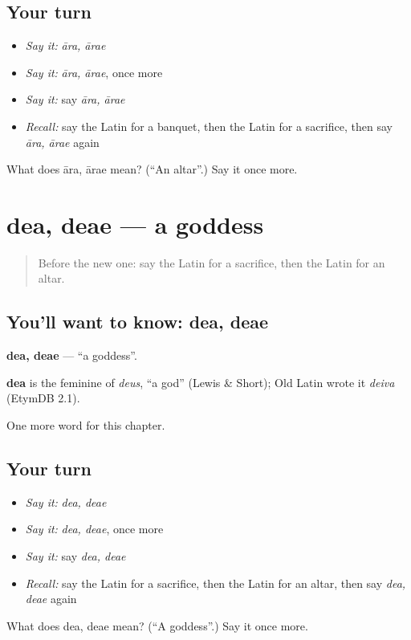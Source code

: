 \subsection*{Your turn}
\begin{itemize}
\raggedright
  \item \emph{Say it:} \emph{āra, ārae}
  \item \emph{Say it:} \emph{āra, ārae}, once more
  \item \emph{Say it:} say \emph{āra, ārae}
  \item \emph{Recall:} say the Latin for a banquet, then the Latin for a sacrifice, then say \emph{āra, ārae} again
\end{itemize}

\begin{tcolorbox}[breakable,colback=teal!4,colframe=teal!35!black,title={Before you move on}]
What does āra, ārae mean? (\textquotedblleft{}An altar\textquotedblright{}.) Say it once more.
\end{tcolorbox}
\section[dea, deae]{dea, deae — a goddess}

\label{lesson:LA-C253-dea}



\begin{quote}
Before the new one: say the Latin for a sacrifice, then the Latin for an altar.
\end{quote}

\subsection*{You'll want to know: dea, deae}
\textbf{dea, deae} — \textquotedblleft{}a goddess\textquotedblright{}.

\begin{cousinweb}
\textbf{dea} is the feminine of \emph{deus}, \textquotedblleft{}a god\textquotedblright{} (Lewis \& Short); Old Latin wrote it \emph{deiva} (EtymDB 2.1).
\end{cousinweb}

\begin{grammarlens}[title={What you've built}]
One more word for this chapter.
\end{grammarlens}

\subsection*{Your turn}
\begin{itemize}
\raggedright
  \item \emph{Say it:} \emph{dea, deae}
  \item \emph{Say it:} \emph{dea, deae}, once more
  \item \emph{Say it:} say \emph{dea, deae}
  \item \emph{Recall:} say the Latin for a sacrifice, then the Latin for an altar, then say \emph{dea, deae} again
\end{itemize}

\begin{tcolorbox}[breakable,colback=teal!4,colframe=teal!35!black,title={Before you move on}]
What does dea, deae mean? (\textquotedblleft{}A goddess\textquotedblright{}.) Say it once more.
\end{tcolorbox}
